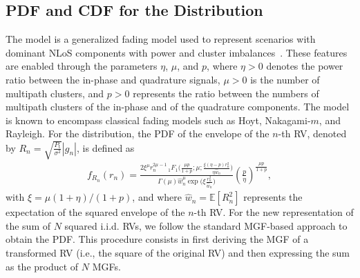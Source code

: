 \documentclass[journal,twocolumn]{IEEEtran}
\begin{document}
\subsection{\ac{PDF} and \ac{CDF} for the \Ehm{} Distribution} \label{sec:newrep_Ehm}

The \Ehm{} model is a generalized fading model used to represent scenarios with dominant \ac{NLoS} components with power and cluster imbalances~\cite{Tej20}. These features are enabled through the parameters $\eta$, $\mu$, and $p$, where $\eta > 0$ denotes the power ratio between the in-phase and quadrature signals, $\mu > 0$ is the number of multipath clusters, and $p > 0$ represents the ratio between the numbers of multipath clusters of the in-phase and of the quadrature components. The \Ehm{} model is known to encompass classical fading models such as Hoyt, Nakagami-$m$, and Rayleigh. For the \Ehm{} distribution, the \ac{PDF} of the envelope of the $n$-th \ac{RV}, denoted by $R_{n} = \sqrt{\frac{P_{\textrm{t}}}{\sigma^{2}}} |g_{n}|$, is defined as~\cite[Eq.~(14)]{Tej20}
\begin{align} \label{eq:hm:fr}
f_{R_n}(r_n) = \frac{2\xi^{\mu}r_n^{2 \mu -1} \,_1F_1\big(\frac{\mu  p}{1+p};\mu ;\frac{\xi  (\eta -p) r_n^2}{\eta \hat{w}_n}\big)}{\Gamma (\mu ) \hat{w}_n^{\mu} \exp\big(\xi\frac{r_n^2}{\hat{w}_n}\big) } \left(\frac{p}{\eta }\right)^{\frac{\mu  p}{1+p}},
\end{align}
with $\xi=\mu \left(1 + \eta\right)/ \left( 1+p\right)$, and where $\hat{w}_n = \mathbb{E}[R_n^2]$ represents the expectation of the squared envelope of the $n$-th RV.
For the new representation of the sum of $N$ squared \ac{i.i.d.} \acp{RV}, we follow the standard \ac{MGF}-based approach to obtain the \ac{PDF}. This procedure consists in first deriving the \ac{MGF} of a transformed \ac{RV} (i.e., the square of the original \ac{RV}) and then expressing the sum as the product of $N$ \acp{MGF}.
\end{document}
